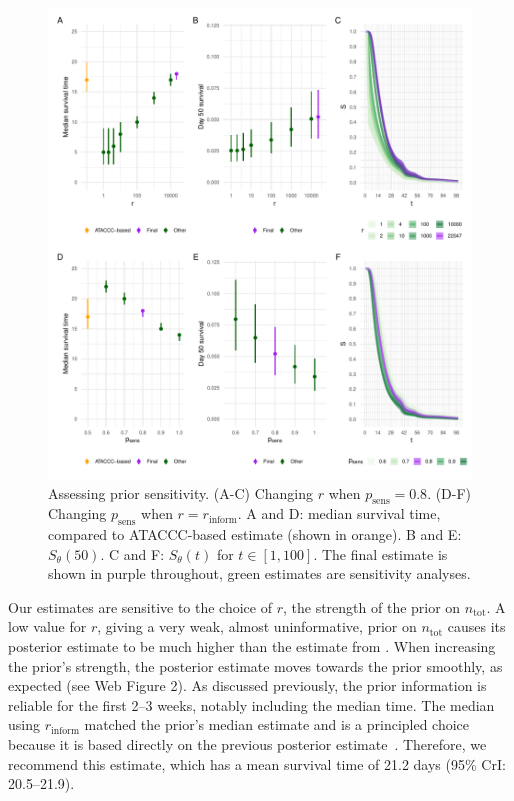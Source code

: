 \documentclass[referee,useAMS,usenatbib]{biom}
\newcommand{\psens}{p_\text{sens}}
\newcommand{\ntot}{n_\text{tot}}
\newcommand{\inform}{{_{\text{inform}}}}
\begin{document}
\begin{figure}
  \includegraphics{figures/output/CIS_vary}
  \caption{%
    Assessing prior sensitivity.
    (A-C) Changing $r$ when $\psens = 0.8$.
    (D-F) Changing $\psens$ when $r = r\inform$.
    A and D: median survival time, compared to ATACCC-based estimate (shown in orange).
    B and E: $S_\theta(50)$.
    C and F: $S_\theta(t)$ for $t \in [1, 100]$.
    The final estimate is shown in purple throughout, green estimates are sensitivity analyses.
  }
  \label{imperf-test:fig:cis-sensitivity}
\end{figure}


Our estimates are sensitive to the choice of $r$, the strength of the prior on $\ntot$.
A low value for $r$, giving a very weak, almost uninformative, prior on $\ntot$ causes its posterior estimate to be much higher than the estimate from \citet{birrellRTM2}.
When increasing the prior's strength, the posterior estimate moves towards the prior smoothly, as expected (see Web Figure 2).
As discussed previously, the prior information is reliable for the first 2--3 weeks, notably including the median time.
The median using $r\inform$ matched the prior's median estimate and is a principled choice because it is based directly on the previous posterior estimate~\citet{birrellRTM2}.
Therefore, we recommend this estimate, which has a mean survival time of 21.2 days (95\% CrI: 20.5--21.9).
\end{document}
